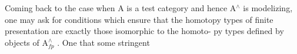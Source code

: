 Coming back to the case when A is a test category\hand{,} and hence A$^\wedge$ is
modelizing,  one may ask for conditions  which ensure that the homotopy
types of finite presentation are exactly those isomorphic to the homoto-%
py types defined by objects of A$^\wedge_{fp}$ .  One   that some stringent

